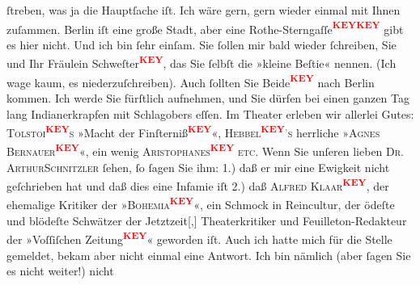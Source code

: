 \begin{ledgroupsized}[t]{13cm}
               ſtreben, was ja die Hauptſache iſt. Ich wäre gern, gern wieder einmal mit Ihnen
               zuſammen. Berlin iſt eine große Stadt, aber eine
                  Rothe-Sterngaſſe\textcolor{red}{\textsuperscript{\textbf{KEY}}}\textcolor{red}{\textsuperscript{\textbf{KEY}}} gibt es hier nicht. Und ich bin ſehr einſam.\pend
           \pstart
           Sie ſollen mir bald wieder ſchreiben, Sie und Ihr Fräulein Schweſter\textcolor{red}{\textsuperscript{\textbf{KEY}}}, das Sie ſelbſt die »kleine Beſtie«
               nennen. (Ich wage kaum, es niederzuſchreiben). Auch ſollten Sie Beide\textcolor{red}{\textsuperscript{\textbf{KEY}}} nach Berlin kommen. Ich werde Sie fürſtlich aufnehmen, {\pb} und Sie dürfen bei \label{XXXXv}\label{XXXX} einen ganzen Tag lang Indianerkrapfen mit
               Schlagobers eſſen.\pend
           \pstart
           Im Theater erleben wir allerlei Gutes: \textsc{Tolstoi\textcolor{red}{\textsuperscript{\textbf{KEY}}}s} »Macht der
                  Finſterniß\textcolor{red}{\textsuperscript{\textbf{KEY}}}«, \textsc{Hebbel\textcolor{gray}{}\textcolor{red}{\textsuperscript{\textbf{KEY}}}\textcolor{gray}{’}s} herrliche »\textsc{Agnes Bernauer\textcolor{red}{\textsuperscript{\textbf{KEY}}}}«, ein wenig \textsc{Aristophanes\textcolor{red}{\textsuperscript{\textbf{KEY}}} etc}.\pend
           \pstart
           Wenn Sie unſeren lieben \textsc{Dr. Arthur}\textsc{Schnitzler} ſehen, ſo ſagen Sie ihm: 1.) daß er mir eine Ewigkeit nicht geſchrieben hat und
               daß dies eine Infamie iſt 2.) daß \textsc{Alfred Klaar\textcolor{red}{\textsuperscript{\textbf{KEY}}}}, der ehemalige Kritiker der »\textsc{Bohemia\textcolor{red}{\textsuperscript{\textbf{KEY}}}}«, ein Schmock in Reincultur, der ödeſte und blödeſte Schwätzer der
                  Jetztzeit{[},{]} Theaterkritiker und Feuilleton-Redakteur der »Voſſiſchen Zeitung\textcolor{red}{\textsuperscript{\textbf{KEY}}}« geworden iſt. Auch ich hatte mich für
               die Stelle gemeldet, {\pb}bekam aber
               nicht einmal eine Antwort. Ich bin nämlich (aber ſagen Sie es nicht weiter!) nicht

\end{ledgroupsized}
